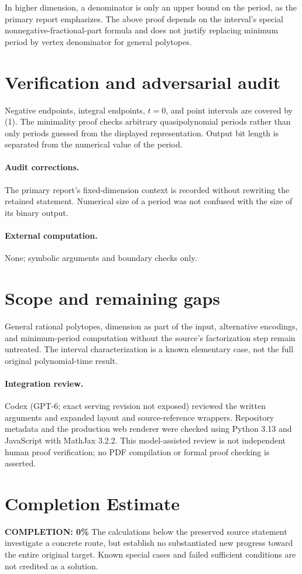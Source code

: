 \documentclass[11pt]{article}
\begin{document}
In higher dimension, a denominator is only an upper bound on the period, as the primary report emphasizes. The above proof depends on the interval's special nonnegative-fractional-part formula and does not justify replacing minimum period by vertex denominator for general polytopes.
\section{Verification and adversarial audit}
Negative endpoints, integral endpoints, $t=0$, and point intervals are covered by (1). The minimality proof checks arbitrary quasipolynomial periods rather than only periods guessed from the displayed representation. Output bit length is separated from the numerical value of the period.
\paragraph{Audit corrections.} The primary report's fixed-dimension context is recorded without rewriting the retained statement. Numerical size of a period was not confused with the size of its binary output.
\paragraph{External computation.} None; symbolic arguments and boundary checks only.
\section{Scope and remaining gaps}
General rational polytopes, dimension as part of the input, alternative encodings, and minimum-period computation without the source's factorization step remain untreated. The interval characterization is a known elementary case, not the full original polynomial-time result.
\paragraph{Integration review.} Codex (GPT-6; exact serving revision not exposed) reviewed the written arguments and expanded layout and source-reference wrappers. Repository metadata and the production web renderer were checked using Python 3.13 and JavaScript with MathJax 3.2.2. This model-assisted review is not independent human proof verification; no PDF compilation or formal proof checking is asserted.

\section{Completion Estimate}
\noindent\textbf{COMPLETION: 0\%}
The calculations below the preserved source statement investigate a concrete route,
but establish no substantiated new progress toward the entire original target.
Known special cases and failed sufficient conditions are not credited as a solution.
\end{document}
